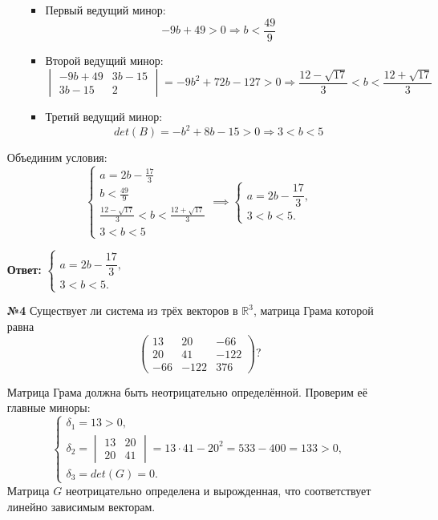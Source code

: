 \documentclass[a4paper]{article}
\newcommand{\case}[1]{\begin{cases} #1 \end{cases}}
\newcommand{\RR}{\mathbb{R}}
\begin{document}
\begin{enumerate}
\begin{enumerate}
        \begin{itemize}
            \item Первый ведущий минор:
            \[
            -9b + 49 > 0 \Rightarrow b < \frac{49}{9}
            \]
        
            \item Второй ведущий минор:
            \[
            \begin{vmatrix}
            -9b + 49 & 3b - 15 \\
            3b - 15 & 2
            \end{vmatrix} = -9b^2 + 72b - 127 > 0 \Rightarrow 
                \frac{12 - \sqrt{17}}{3} < b < \frac{12 + \sqrt{17}}{3}
            \]
        
            \item Третий ведущий минор:
            \[
            det(B) = -b^2 + 8b - 15 > 0 \Rightarrow 3 < b < 5
            \]
        \end{itemize}
    \end{enumerate}

    Объединим условия:
    $$\case{
        a = 2b - \frac{17}{3}\\
        b < \frac{49}{9}\\
        \frac{12 - \sqrt{17}}{3} < b < \frac{12 + \sqrt{17}}{3}\\
        3 < b < 5
    } \implies \begin{cases}
        a = 2b - \dfrac{17}{3}, \\
        3 < b < 5.
        \end{cases}$$

    \textbf{Ответ: } $\begin{cases}
        a = 2b - \dfrac{17}{3}, \\
        3 < b < 5.
        \end{cases}$\\


    \item[\textbf{№4}]
    Существует ли система из трёх векторов в $\RR^3$, матрица Грама которой равна
    \[
    \begin{pmatrix}
    13 & 20 & -66 \\
    20 & 41 & -122 \\
    -66 & -122 & 376
    \end{pmatrix}?
    \]

    Матрица Грама должна быть неотрицательно определённой. Проверим её главные миноры:
    \[
    \begin{cases}
    \delta_1 = 13 > 0, \\
    \delta_2 = \begin{vmatrix} 13 & 20 \\ 20 & 41 \end{vmatrix} = 13 \cdot 41 - 20^2 = 533 - 400 = 133 > 0, \\
    \delta_3 = det(G) = 0.
    \end{cases}
    \]
    Матрица $G$ неотрицательно определена и вырожденная, что соответствует линейно зависимым векторам.
    

\end{enumerate}
\end{document}
